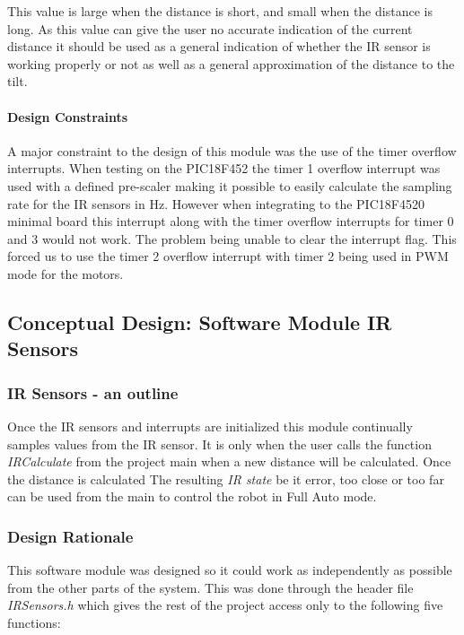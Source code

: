 \documentclass{article}
\begin{document}
This value is large when the distance is short, and small when the distance is long. As this value can give the user no accurate indication of the current distance it should be used as a general indication of whether the IR sensor is working properly or not as well as a general approximation of the distance to the tilt.
 
\paragraph{Design Constraints}
A major constraint to the design of this module was the use of the timer overflow interrupts. When testing on the PIC18F452 the timer 1 overflow interrupt was used with a defined pre-scaler making it possible to easily calculate the sampling rate for the IR sensors in Hz. However when integrating to the PIC18F4520 minimal board this interrupt along with the timer overflow interrupts for timer 0 and 3 would not work. The problem being unable to clear the interrupt flag. This forced us to use the timer 2 overflow interrupt with timer 2 being used in PWM mode for the motors.   

\subsection{Conceptual Design: Software Module IR Sensors}


\subsubsection{IR Sensors - an outline}
Once the IR sensors and interrupts are initialized this module continually samples values from the IR sensor. It is only when the user calls the function \textit{IR\textunderscore  Calculate} from the project main when a new distance will be calculated. Once the distance is calculated The resulting \textit{IR state} be it error, too close or too far can be used from the main to control the robot in Full Auto mode.

\subsubsection{Design Rationale}
This software module was designed so it could work as independently as possible from the other parts of the system. This was done through the header file \textit{IR\textunderscore Sensors.h} which gives the rest of the project access only to the following five functions:
\end{document}
